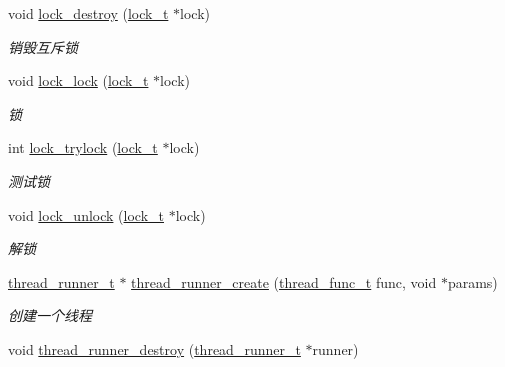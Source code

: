 \begin{DoxyCompactItemize}
void \hyperlink{a00082_aba61c8c4b8ee5ec7e337ed950d680702_aba61c8c4b8ee5ec7e337ed950d680702}{lock\+\_\+destroy} (\hyperlink{a00051_ad3e00e0eb0c79dfd77ff2ff833f49c7d_ad3e00e0eb0c79dfd77ff2ff833f49c7d}{lock\+\_\+t} $\ast$lock)
\begin{DoxyCompactList}\small\item\em 销毁互斥锁 \end{DoxyCompactList}\item 
void \hyperlink{a00082_ad8e04f3d702d3f15868c064947d396b3_ad8e04f3d702d3f15868c064947d396b3}{lock\+\_\+lock} (\hyperlink{a00051_ad3e00e0eb0c79dfd77ff2ff833f49c7d_ad3e00e0eb0c79dfd77ff2ff833f49c7d}{lock\+\_\+t} $\ast$lock)
\begin{DoxyCompactList}\small\item\em 锁 \end{DoxyCompactList}\item 
int \hyperlink{a00082_a2caa15f5d1698c623c1861bd02184d0e_a2caa15f5d1698c623c1861bd02184d0e}{lock\+\_\+trylock} (\hyperlink{a00051_ad3e00e0eb0c79dfd77ff2ff833f49c7d_ad3e00e0eb0c79dfd77ff2ff833f49c7d}{lock\+\_\+t} $\ast$lock)
\begin{DoxyCompactList}\small\item\em 测试锁 \end{DoxyCompactList}\item 
void \hyperlink{a00082_a99cf1d42527f5715b798064281e918ed_a99cf1d42527f5715b798064281e918ed}{lock\+\_\+unlock} (\hyperlink{a00051_ad3e00e0eb0c79dfd77ff2ff833f49c7d_ad3e00e0eb0c79dfd77ff2ff833f49c7d}{lock\+\_\+t} $\ast$lock)
\begin{DoxyCompactList}\small\item\em 解锁 \end{DoxyCompactList}\item 
\hyperlink{a00051_a9054159cde2f926ef61c28ce1e555199_a9054159cde2f926ef61c28ce1e555199}{thread\+\_\+runner\+\_\+t} $\ast$ \hyperlink{a00109_gac20d7726e152e0b49209ce228893c25d_gac20d7726e152e0b49209ce228893c25d}{thread\+\_\+runner\+\_\+create} (\hyperlink{a00051_a46bcd8005e5d86fdbc6be5af0a77156c_a46bcd8005e5d86fdbc6be5af0a77156c}{thread\+\_\+func\+\_\+t} func, void $\ast$params)
\begin{DoxyCompactList}\small\item\em 创建一个线程 \end{DoxyCompactList}\item 
void \hyperlink{a00109_ga8b9d3d45b6055971fc40f24ec6572cf6_ga8b9d3d45b6055971fc40f24ec6572cf6}{thread\+\_\+runner\+\_\+destroy} (\hyperlink{a00051_a9054159cde2f926ef61c28ce1e555199_a9054159cde2f926ef61c28ce1e555199}{thread\+\_\+runner\+\_\+t} $\ast$runner)

\end{DoxyCompactItemize}
